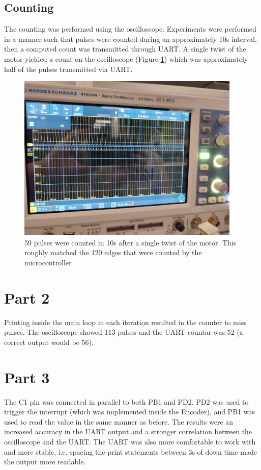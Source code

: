 \documentclass{article}
\begin{document}
\subsection*{Counting}
The counting was performed using the oscilloscope. Experiments were performed in a manner
such that pulses were counted during an approximately 10s interval, then a computed count
was transmitted through UART. A single twist of the motor yielded a count on the
oscilloscope (Figure \ref{fig:osc}) which was approximately half of the pulses transmitted via UART.

\begin{figure}[h]
	\begin{center}
		\includegraphics[width=0.95\textwidth]{./oscilloscope.jpeg}
	\end{center}
	\caption{59 pulses were counted in 10s after a single twist of the motor. This roughly
		matched the 120 edges that were counted by the microcontroller}\label{fig:osc}
\end{figure}

\section*{Part 2}
Printing inside the main loop in each iteration resulted in the counter to miss pulses.
The oscilloscope showed 113 pulses and the UART countar was 52 (a correct output would be
56).

\section*{Part 3}
The C1 pin was connected in parallel to both PB1 and PD2. PD2 was used to trigger the
interrupt (which was implemented inside the Encoder), and PB1 was used to read the value
in the same manner as before. The results were an increased accuracy in the UART output
and a stronger correlation between the oscilloscope and the UART. The UART was also more
comfortable to work with and more stable, i.e. spacing the print statements between 3s of
down time made the output more readable.

\end{document}
